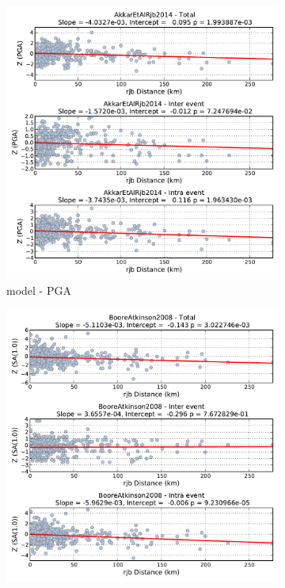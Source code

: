 \begin{figure}[htb]
\begin{subfigure}[b]{0.49\textwidth}
      \includegraphics[width=\textwidth]{./figures/residuals/Akkar2014_Distance_PGA.pdf}
      \caption{\cite{Akkar_etal2014} model - PGA}
      \label{fig:pga_dist_akkar2014}
  \end{subfigure}
    \begin{subfigure}[b]{0.49\textwidth}
      \includegraphics[width=\textwidth]{./figures/residuals/BA2008_Distance_Sa1.pdf}

\end{subfigure}
\end{figure}
